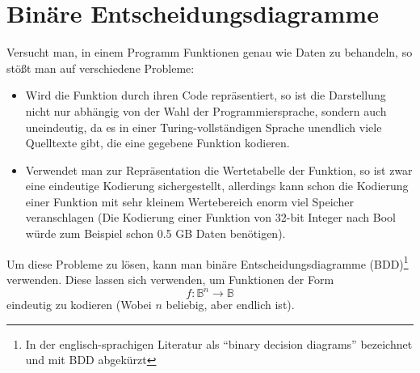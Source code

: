 \section{Binäre Entscheidungsdiagramme}
Versucht man, in einem Programm Funktionen genau wie Daten zu behandeln, so stößt man auf verschiedene Probleme:
\begin{itemize}
\item Wird die Funktion durch ihren Code repräsentiert, so ist die Darstellung nicht nur abhängig von der Wahl der Programmiersprache, sondern auch uneindeutig, da es in einer Turing-vollständigen Sprache unendlich viele Quelltexte gibt, die eine gegebene Funktion kodieren.
\item Verwendet man zur Repräsentation die Wertetabelle der Funktion, so ist zwar eine eindeutige Kodierung sichergestellt, allerdings kann schon die Kodierung einer Funktion mit sehr kleinem Wertebereich enorm viel Speicher veranschlagen (Die Kodierung einer Funktion von 32-bit Integer nach Bool würde zum Beispiel schon 0.5 GB Daten benötigen).
\end{itemize}
Um diese Probleme zu lösen, kann man binäre Entscheidungsdiagramme (BDD)\footnote{In der englisch-sprachigen Literatur als "`binary decision diagrams"' bezeichnet und mit BDD abgekürzt} verwenden.
Diese lassen sich verwenden, um Funktionen der Form
\[ f : \mathbb{B}^n\rightarrow\mathbb{B} \]
eindeutig zu kodieren (Wobei $n$ beliebig, aber endlich ist).

